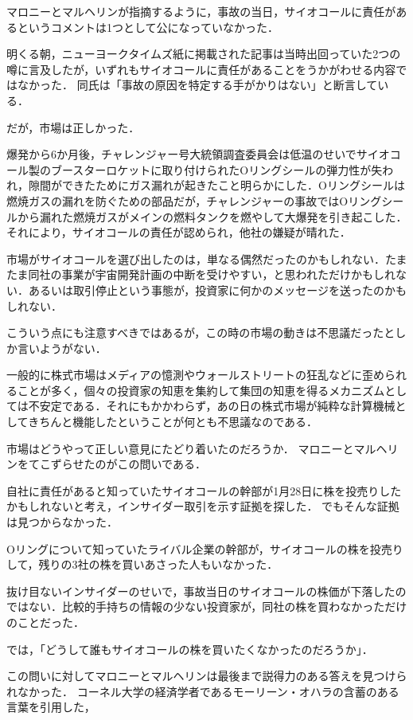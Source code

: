 マロニーとマルヘリンが指摘するように，事故の当日，サイオコールに責任があるというコメントは1つとして公になっていなかった．

明くる朝，ニューヨークタイムズ紙に掲載された記事は当時出回っていた2つの噂に言及したが，いずれもサイオコールに責任があることをうかがわせる内容ではなかった．
同氏は「事故の原因を特定する手がかりはない」と断言している．

だが，市場は正しかった．

爆発から6か月後，チャレンジャー号大統領調査委員会は低温のせいでサイオコール製のブースターロケットに取り付けられたOリングシールの弾力性が失われ，隙間ができたためにガス漏れが起きたこと明らかにした．Oリングシールは燃焼ガスの漏れを防ぐための部品だが，チャレンジャーの事故ではOリングシールから漏れた燃焼ガスがメインの燃料タンクを燃やして大爆発を引き起こした．
それにより，サイオコールの責任が認められ，他社の嫌疑が晴れた．

市場がサイオコールを選び出したのは，単なる偶然だったのかもしれない．たまたま同社の事業が宇宙開発計画の中断を受けやすい，と思われただけかもしれない．あるいは取引停止という事態が，投資家に何かのメッセージを送ったのかもしれない．

こういう点にも注意すべきではあるが，この時の市場の動きは不思議だったとしか言いようがない．

一般的に株式市場はメディアの憶測やウォールストリートの狂乱などに歪められることが多く，個々の投資家の知恵を集約して集団の知恵を得るメカニズムとしては不安定である．それにもかかわらず，あの日の株式市場が純粋な計算機械としてきちんと機能したということが何とも不思議なのである．

市場はどうやって正しい意見にたどり着いたのだろうか．
マロニーとマルヘリンをてこずらせたのがこの問いである．

自社に責任があると知っていたサイオコールの幹部が1月28日に株を投売りしたかもしれないと考え，インサイダー取引を示す証拠を探した．
でもそんな証拠は見つからなかった．

Oリングについて知っていたライバル企業の幹部が，サイオコールの株を投売りして，残りの3社の株を買いあさった人もいなかった．

抜け目ないインサイダーのせいで，事故当日のサイオコールの株価が下落したのではない．比較的手持ちの情報の少ない投資家が，同社の株を買わなかっただけのことだった．

では，「どうして誰もサイオコールの株を買いたくなかったのだろうか」．

この問いに対してマロニーとマルヘリンは最後まで説得力のある答えを見つけられなかった．
コーネル大学の経済学者であるモーリーン・オハラの含蓄のある言葉を引用した，

